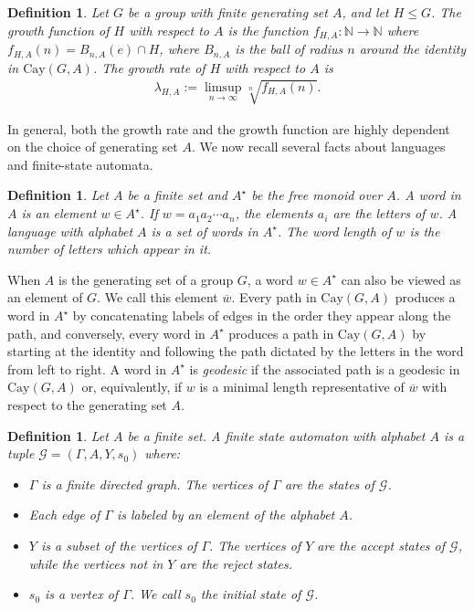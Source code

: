 \documentclass[10pt,a4paper]{amsart}
\newtheorem{definition}[theorem]{Definition}
\begin{document}
\begin{definition}
    Let $G$ be a group with finite generating set $A$, and let $H \leq G$. The \emph{growth function} of $H$ with respect to $A$ is the function $f_{H,A}: \mathbb{N} \rightarrow \mathbb{N}$ where $f_{H,A}(n) = B_{n,A}(e) \cap H$, where $B_{n,A}$ is the ball of radius $n$ around the identity in $\text{Cay}(G,A)$. The \emph{growth rate} of $H$ with respect to $A$ is
\begin{align*}
    \lambda_{H,A} := \limsup_{n \rightarrow \infty} \sqrt[n]{f_{H,A}(n)}\text{.}
\end{align*}
\end{definition}

In general, both the growth rate and the growth function are highly dependent on the choice of generating set $A$. We now recall several facts about languages and finite-state automata.
\begin{definition}
    Let $A$ be a finite set and $A^{\star}$ be the free monoid over $A$. A \emph{word} in $A$ is an element $w \in A^{\star}$. If $w = a_1 a_2 \cdots a_n$, the elements $a_i$ are the \emph{letters} of $w$. A \emph{language with alphabet $A$} is a set of words in $A^{\star}$. The \emph{word length} of $w$ is the number of letters which appear in it.
\end{definition}

When $A$ is the generating set of a group $G$, a word $w \in A^{\star}$ can also be viewed as an element of $G$. We call this element $\overline{w}$. Every path in $\text{Cay}(G,A)$ produces a word in $A^{\star}$ by concatenating labels of edges in the order they appear along the path, and conversely, every word in $A^{\star}$ produces a path in $\text{Cay}(G,A)$ by starting at the identity and following the path dictated by the letters in the word from left to right. A word in $A^{\star}$ is \emph{geodesic} if the associated path is a geodesic in $\text{Cay}(G,A)$ or, equivalently, if $w$ is a minimal length representative of $\overline{w}$ with respect to the generating set $A$. 

\begin{definition}
    Let $A$ be a finite set. A \emph{finite state automaton} with alphabet $A$ is a tuple $\mathcal{G} = (\Gamma, A, Y, s_0)$ where:
    \begin{itemize}
        \item $\Gamma$ is a finite directed graph. The vertices of $\Gamma$ are the \emph{states} of $\mathcal{G}$.
        \item Each edge of $\Gamma$ is labeled by an element of the alphabet $A$.
        \item $Y$ is a subset of the vertices of $\Gamma$. The vertices of $Y$ are the \emph{accept states} of $\mathcal{G}$, while the vertices not in $Y$ are the \emph{reject states}.
        \item $s_0$ is a vertex of $\Gamma$. We call $s_0$ the \emph{initial state} of $\mathcal{G}$.
    \end{itemize}
\end{definition}
\end{document}
